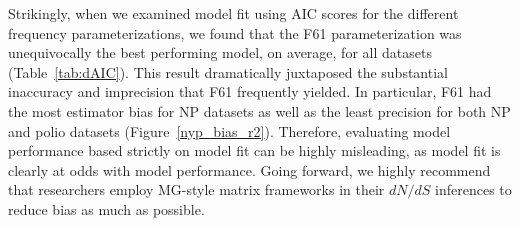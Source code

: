 \documentclass[11pt]{article}
\begin{document}
Strikingly, when we examined model fit using AIC scores \cite{Akaike1974,BurnhamAnderson2004} for the different frequency parameterizations, we found that the F61 parameterization was unequivocally the best performing model, on average, for all datasets (Table~\ref{tab:dAIC}). This result dramatically juxtaposed the substantial inaccuracy and imprecision that F61 frequently yielded. In particular, F61 had the most estimator bias for NP datasets as well as the least precision for both NP and polio datasets (Figure~\ref{nyp_bias_r2}). Therefore, evaluating model performance based strictly on model fit can be highly misleading, as model fit is clearly at odds with model performance. Going forward, we highly recommend that researchers employ MG-style matrix frameworks in their $dN/dS$ inferences to reduce bias as much as possible.




\end{document}
